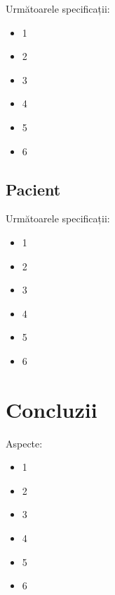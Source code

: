 \documentclass[a4paper,12pt]{article}
\begin{document}
Următoarele specificații:

\begin{itemize}
\item 1
\item 2
\item 3
\item 4
\item 5
\item 6
\end{itemize}

\subsection{Pacient}

Următoarele specificații:

\begin{itemize}
\item 1
\item 2
\item 3
\item 4
\item 5
\item 6
\end{itemize}

\section{Concluzii}

Aspecte:

\begin{itemize}
\item 1
\item 2
\item 3
\item 4
\item 5
\item 6
\end{itemize}
\end{document}
